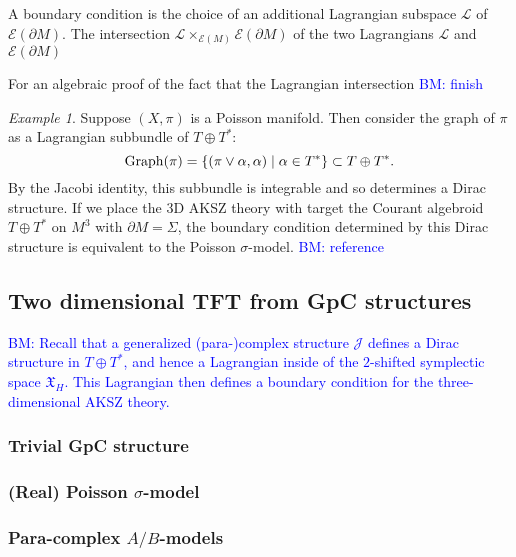 \documentclass{article}
\newcommand{\TT}{{T\oplus T^*}}
\newcommand{\JJ}{\mathcal{J}}
\newcommand{\XX}{\mathfrak{X}}
\newcommand{\cE}{\mathcal{E}}
\theoremstyle{definition}
\theoremstyle{remark}
\newtheorem{Ex}[theorem]{Example}
\def\brian{\textcolor{blue}{BM: }\textcolor{blue}}
\begin{document}
\def\cL{\mathcal{L}}

A boundary condition is the choice of an additional Lagrangian subspace $\cL$ of $\cE(\partial M)$.
The intersection $\cL \times_{\cE(M)} \cE(\partial M)$ of the two Lagrangians $\cL$ and $\cE(\partial M)$ 

For an algebraic proof of the fact that the Lagrangian intersection \brian{finish} \cite{Calaque}

\begin{Ex}
Suppose $(X, \pi)$ is a Poisson manifold. 
Then consider the graph of $\pi$ as a Lagrangian subbundle of $\TT$:
\[
{\rm Graph}(\pi) = \{(\pi \vee \alpha , \alpha) \; | \; \alpha \in T^* \} \subset \TT .
\]
By the Jacobi identity, this subbundle is integrable and so determines a Dirac structure. 
If we place the 3D AKSZ theory with target the Courant algebroid $\TT$ on $M^3$ with $\partial M = \Sigma$, the boundary condition determined by this Dirac structure is equivalent to the Poisson $\sigma$-model. \brian{reference}
\end{Ex}

\subsection{Two dimensional TFT from GpC structures}

\brian{Recall that a generalized (para-)complex structure $\JJ$ defines a Dirac structure in $\TT$, and hence a Lagrangian inside of the $2$-shifted symplectic space $\XX_H$.  
This Lagrangian then defines a boundary condition for the three-dimensional AKSZ theory. }

\subsubsection*{Trivial GpC structure}

\subsubsection*{(Real) Poisson $\sigma$-model}

\subsubsection*{Para-complex $A/B$-models}
\end{document}
